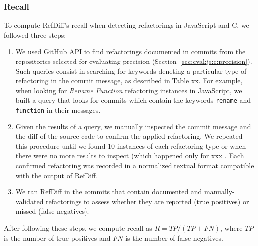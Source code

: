 \subsubsection{Recall}
\label{sec:eval:js:c:recall}

To compute RefDiff's recall when detecting refactorings in JavaScript and C, we followed three steps:

\begin{enumerate}  
\item We used GitHub API to find refactorings documented in commits from the repositories selected for evaluating precision (Section~\ref{sec:eval:js:c:precision}). Such queries consist in searching for keywords denoting a particular type of refactoring in the commit message, as described in Table xx. For example, when looking for \emph{Rename Function} refactoring instances in JavaScript, we built a query that looks for commits which contain the keywords \texttt{rename} and \texttt{function} in their messages.

\item Given the results of a query, we manually inspected the commit message and the diff of the source code to confirm the applied refactoring. We repeated this procedure until we found 10 instances of each refactoring type or when there were no more results to inspect (which happened only for xxx . Each confirmed refactoring was recorded in a normalized textual format compatible with the output of RefDiff.


\item We ran RefDiff in the commits that contain documented and manually-validated refactorings to assess whether they are reported (true positives) or missed (false negatives). 

\end{enumerate}

After following these steps, we compute recall as $R = \mathit{TP} / (\mathit{TP} + \mathit{FN})$, where $\mathit{TP}$ is the number of true positives and $\mathit{FN}$ is the number of false negatives.


